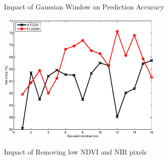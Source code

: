 \documentclass[remotesensing,article,accept,moreauthors,pdftex,12pt,a4paper]{mdpi}
\begin{document}
\begin{figure}[t]
  \centering
  \hspace{1em}%

   \caption{Impact of Gaussian Window on Prediction Accuracy}
       \label{fig:water absorption bands}
\end{figure}

\begin{figure}[t]
  \centering
    {\includegraphics[height=2.5in,keepaspectratio]{./images/after-removing-ndvi-nir.eps}}\hspace{1em}%

   \caption{Impact of Removing low NDVI and NIR pixels\label{fig:after removing NDVI NIR}}
       \label{fig:parameter tuning}
\end{figure}
\end{document}
